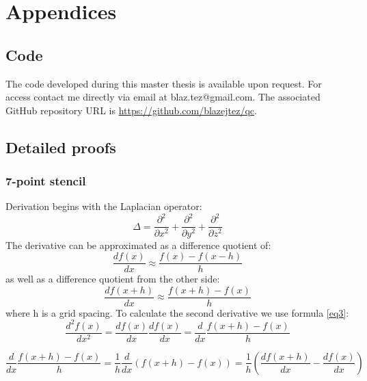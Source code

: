 \section{Appendices}
\subsection{Code}

The code developed during this master thesis is available upon request. For access contact me directly via email at blaz.tez@gmail.com. The associated GitHub repository URL is \url{https://github.com/blazejtez/qc}.

\subsection{Detailed proofs}
\subsubsection{7-point stencil}
Derivation begins with the Laplacian operator:
\begin{equation}
	\Delta = \frac{\partial^2}{\partial x^2} + \frac{\partial^2}{\partial y^2} + \frac{\partial^2}{\partial z^2}
	\label{eq1}
\end{equation}
The derivative can be approximated as a difference quotient of:
\begin{equation}
	\frac{df(x)}{dx} \approx \frac{f(x)-f(x-h)}{h}
	\label{eq2}
\end{equation}
as well as a difference quotient from the other side:
\begin{equation}
	\frac{df(x+h)}{dx} \approx \frac{f(x+h)-f(x)}{h}
	\label{eq3}
\end{equation}
where h is a grid spacing.
To calculate the second derivative we use formula \ref{eq3}:
\begin{equation}
	\frac{d^2f(x)}{dx^2} = \frac{df(x)}{dx} \frac{df(x)}{dx} = \frac{d}{dx} \frac{f(x+h)-f(x)}{h}
\end{equation}

\begin{equation}
	\frac{d}{dx} \frac{f(x+h)-f(x)}{h} = \frac{1}{h} \frac{d}{dx}(f(x+h)-f(x)) = \frac{1}{h} (\frac{df(x+h)}{dx} - \frac{df(x)}{dx})
\end{equation}

